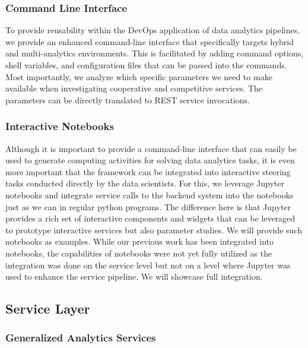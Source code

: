 \subsubsection{Command Line Interface}

To provide reusability within the DevOps application of data analytics
pipelines, we provide an enhanced command-line interface that
specifically targets hybrid and multi-analytics environments. This is
facilitated by adding command options, shell variables, and
configuration files that can be passed into the commands.
Most importantly, we analyze which specific parameters we
need to make available when investigating cooperative and competitive
services. The parameters can be directly translated to REST service invocations.

\subsubsection{Interactive Notebooks}

Although it is important to provide a command-line interface that can
easily be used to generate computing activities for solving data
analytics tasks, it is even more important that the framework can be
integrated into interactive steering tasks conducted directly by the
data scientists. For this, we leverage Jupyter notebooks and integrate
service calls to the backend system into the notebooks just as we can
in regular python programs. The difference here is that Jupyter
provides a rich set of interactive components and widgets that can be
leveraged to prototype interactive services but also parameter
studies. We will provide such notebooks as examples. While our
previous work has been integrated into notebooks, the capabilities of
notebooks were not yet fully utilized as the integration was done on
the service level but not on a level where Jupyter was used to enhance
the service pipeline. We will showcase full integration.

\subsection {Service Layer}

\subsubsection{Generalized Analytics Services}
\label{s:gas}

